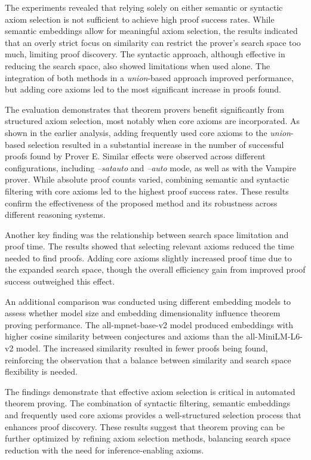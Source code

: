 \documentclass[english,version-2020-11]{uzl-thesis}
\begin{document}
The experiments revealed that relying solely on either semantic or syntactic axiom selection is not sufficient to achieve high proof success rates. While semantic embeddings allow for meaningful axiom selection, the results indicated that an overly strict focus on similarity can restrict the prover’s search space too much, limiting proof discovery. The syntactic approach, although effective in reducing the search space, also showed limitations when used alone. The integration of both methods in a \textit{union}-based approach improved performance, but adding core axioms led to the most significant increase in proofs found.

The evaluation demonstrates that theorem provers benefit significantly from structured axiom selection, most notably when core axioms are incorporated. As shown in the earlier analysis, adding frequently used core axioms to the \textit{union}-based selection resulted in a substantial increase in the number of successful proofs found by Prover E. Similar effects were observed across different configurations, including \textit{--satauto} and \textit{--auto} mode, as well as with the Vampire prover. While absolute proof counts varied, combining semantic and syntactic filtering with core axioms led to the highest proof success rates. These results confirm the effectiveness of the proposed method and its robustness across different reasoning systems.

Another key finding was the relationship between search space limitation and proof time. The results showed that selecting relevant axioms reduced the time needed to find proofs. Adding core axioms slightly increased proof time due to the expanded search space, though the overall efficiency gain from improved proof success outweighed this effect.

An additional comparison was conducted using different embedding models to assess whether model size and embedding dimensionality influence theorem proving performance. The all-mpnet-base-v2 model produced embeddings with higher cosine similarity between conjectures and axioms than the all-MiniLM-L6-v2 model. The increased similarity resulted in fewer proofs being found, reinforcing the observation that a balance between similarity and search space flexibility is needed. 

The findings demonstrate that effective axiom selection is critical in automated theorem proving. The combination of syntactic filtering, semantic embeddings and frequently used core axioms provides a well-structured selection process that enhances proof discovery. These results suggest that theorem proving can be further optimized by refining axiom selection methods, balancing search space reduction with the need for inference-enabling axioms.
\end{document}
